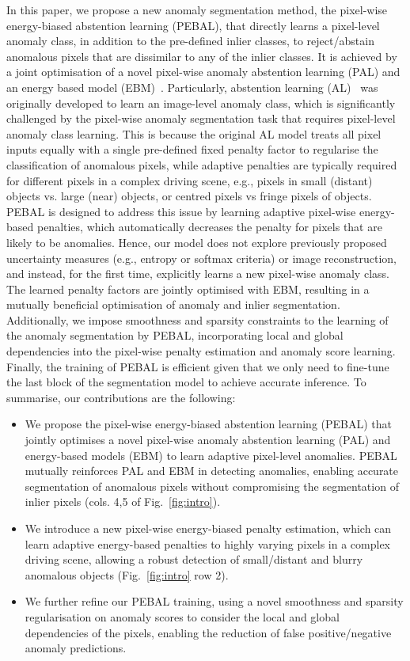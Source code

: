 \documentclass[runningheads]{llncs}
\begin{document}
In this paper, we propose a new anomaly segmentation method, the pixel-wise energy-biased abstention learning (PEBAL), that directly learns a pixel-level anomaly class, in addition to the pre-defined inlier classes, to reject/abstain anomalous pixels that are dissimilar to any of the inlier classes. It is achieved by a joint optimisation of a novel pixel-wise anomaly abstention learning (PAL) and an energy based model (EBM)~\cite{grathwohl2019your,liu2020energy,lecun2006tutorial}. 
Particularly, abstention learning (AL)~\cite{liu2019deep} was originally developed to learn an image-level anomaly class, which is significantly challenged by the pixel-wise anomaly segmentation task that requires pixel-level anomaly class learning. This is because the original AL model treats all pixel inputs equally with a single pre-defined fixed penalty factor to regularise the classification of anomalous pixels, while adaptive penalties are typically required for different pixels in a complex driving scene, e.g., pixels in small (distant) objects vs. large (near) objects, or centred pixels vs fringe pixels of objects. PEBAL is designed to address this issue by learning adaptive pixel-wise energy-based penalties, which automatically decreases the penalty for pixels that are likely to be anomalies.
Hence, our model does not explore previously proposed uncertainty measures (e.g., entropy or softmax criteria) or image reconstruction, and instead, for the first time, explicitly learns a new pixel-wise anomaly class. The learned penalty factors are jointly optimised with EBM, resulting in a mutually beneficial optimisation of anomaly and inlier segmentation. 
Additionally, we impose smoothness and sparsity constraints to the learning of the anomaly segmentation by PEBAL, incorporating local and global dependencies into the pixel-wise penalty estimation and anomaly score learning.
Finally, the training of PEBAL is  efficient given that we only need to fine-tune the last block of the segmentation model to achieve accurate inference.
To summarise, our contributions are the following: 
 \begin{itemize}
 \item We propose the pixel-wise energy-biased abstention learning (PEBAL) that jointly optimises a novel pixel-wise anomaly abstention learning (PAL) and energy-based models (EBM) to learn adaptive pixel-level anomalies. PEBAL mutually reinforces PAL and EBM in detecting anomalies, enabling accurate segmentation of anomalous pixels without compromising the segmentation of inlier pixels (cols. 4,5 of Fig.~\ref{fig:intro}). 
\item We introduce a new pixel-wise energy-biased penalty estimation, which can learn adaptive energy-based penalties to highly varying pixels in a complex driving scene, allowing a robust detection of small/distant and blurry anomalous objects (Fig.~\ref{fig:intro} row 2).  
\item We further refine our PEBAL training, using a novel smoothness and sparsity regularisation on anomaly scores to consider the local and global dependencies of the pixels, enabling the reduction of false positive/negative anomaly predictions.
 \end{itemize}
\end{document}
